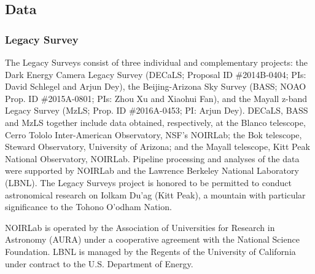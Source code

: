 \documentclass[]{polymathic}
\begin{document}
\subsection{Data}
\subsubsection{Legacy Survey}
The Legacy Surveys consist of three individual and complementary projects: the Dark Energy Camera Legacy Survey (DECaLS; Proposal ID \#2014B-0404; PIs: David Schlegel and Arjun Dey), the Beijing-Arizona Sky Survey (BASS; NOAO Prop. ID \#2015A-0801; PIs: Zhou Xu and Xiaohui Fan), and the Mayall z-band Legacy Survey (MzLS; Prop. ID \#2016A-0453; PI: Arjun Dey). DECaLS, BASS and MzLS together include data obtained, respectively, at the Blanco telescope, Cerro Tololo Inter-American Observatory, NSF’s NOIRLab; the Bok telescope, Steward Observatory, University of Arizona; and the Mayall telescope, Kitt Peak National Observatory, NOIRLab. Pipeline processing and analyses of the data were supported by NOIRLab and the Lawrence Berkeley National Laboratory (LBNL). The Legacy Surveys project is honored to be permitted to conduct astronomical research on Iolkam Du’ag (Kitt Peak), a mountain with particular significance to the Tohono O’odham Nation.

NOIRLab is operated by the Association of Universities for Research in Astronomy (AURA) under a cooperative agreement with the National Science Foundation. LBNL is managed by the Regents of the University of California under contract to the U.S. Department of Energy.
\end{document}
